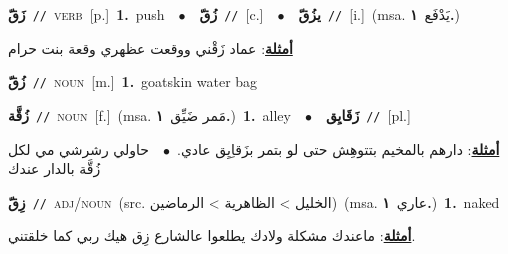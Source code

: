 \documentclass[10pt,a4paper,twoside]{article} %
\begin{document}
\begin{multicols}{2}
{\setlength\topsep{0pt}\textbf{\foreignlanguage{arabic}{زَقّ}}\ {\color{gray}\texttt{//}\color{black}}\ \textsc{verb}\ [p.]\ \textbf{1.}~push\ \ $\bullet$\ \ \setlength\topsep{0pt}\textbf{\foreignlanguage{arabic}{زُقّ}}\ {\color{gray}\texttt{//}\color{black}}\ [c.]\ \ $\bullet$\ \ \setlength\topsep{0pt}\textbf{\foreignlanguage{arabic}{يزُقّ}}\ {\color{gray}\texttt{//}\color{black}}\ [i.]\ \color{gray}(msa. \foreignlanguage{arabic}{يَدْفَع}~\foreignlanguage{arabic}{\textbf{١.}})\color{black}\  \begin{flushright}\color{gray}\foreignlanguage{arabic}{\textbf{\underline{\foreignlanguage{arabic}{أمثلة}}}: عماد زَقْني ووقعت عظهري وقعة بنت حرام}\end{flushright}\color{black}} \vspace{2mm}

{\setlength\topsep{0pt}\textbf{\foreignlanguage{arabic}{زُقّ}}\ {\color{gray}\texttt{//}\color{black}}\ \textsc{noun}\ [m.]\ \textbf{1.}~goatskin water bag\ } \vspace{2mm}

{\setlength\topsep{0pt}\textbf{\foreignlanguage{arabic}{زُقَّة}}\ {\color{gray}\texttt{//}\color{black}}\ \textsc{noun}\ [f.]\ \color{gray}(msa. \foreignlanguage{arabic}{مَمر ضَيِّق}~\foreignlanguage{arabic}{\textbf{١.}})\color{black}\ \textbf{1.}~alley\ \ $\bullet$\ \ \setlength\topsep{0pt}\textbf{\foreignlanguage{arabic}{زَقَايِق}}\ {\color{gray}\texttt{//}\color{black}}\ [pl.]\  \begin{flushright}\color{gray}\foreignlanguage{arabic}{\textbf{\underline{\foreignlanguage{arabic}{أمثلة}}}: دارهم بالمخيم بتتوهِش حتى لو بتمر بزَقاِيِق عادي.\ $\bullet$\ \  حاولي رشرشي مي لكل زُقَّة بالدار عندك}\end{flushright}\color{black}} \vspace{2mm}

{\setlength\topsep{0pt}\textbf{\foreignlanguage{arabic}{زِقّ}}\ {\color{gray}\texttt{//}\color{black}}\ \textsc{adj/noun}\ (src. \color{gray}\foreignlanguage{arabic}{الخليل > الظاهرية > الرماضين}\color{black})\ \color{gray}(msa. \foreignlanguage{arabic}{عاري}~\foreignlanguage{arabic}{\textbf{١.}})\color{black}\ \textbf{1.}~naked\  \begin{flushright}\color{gray}\foreignlanguage{arabic}{\textbf{\underline{\foreignlanguage{arabic}{أمثلة}}}: ماعندك مشكلة ولادك يطلعوا عالشارع زِق هيك ربي كما خلقتني.}\end{flushright}\color{black}} \vspace{2mm}


\end{multicols}
\end{document}
